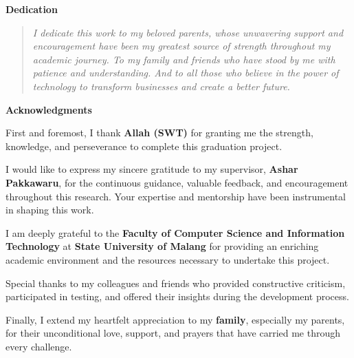 \documentclass[12pt,a4paper]{report}
\begin{document}
\newpage
\thispagestyle{empty}
\vspace*{3cm}
\begin{center}
{\LARGE\textbf{Dedication}}\\[1.5cm]
\end{center}

\begin{quote}
\large
\textit{I dedicate this work to my beloved parents, whose unwavering support and encouragement have been my greatest source of strength throughout my academic journey. To my family and friends who have stood by me with patience and understanding. And to all those who believe in the power of technology to transform businesses and create a better future.}
\end{quote}
\newpage

\newpage
\thispagestyle{empty}
\vspace*{2cm}
\begin{center}
{\LARGE\textbf{Acknowledgments}}\\[1.5cm]
\end{center}

First and foremost, I thank \textbf{Allah (SWT)} for granting me the strength, knowledge, and perseverance to complete this graduation project.

I would like to express my sincere gratitude to my supervisor, \textbf{Ashar Pakkawaru}, for the continuous guidance, valuable feedback, and encouragement throughout this research. Your expertise and mentorship have been instrumental in shaping this work.

I am deeply grateful to the \textbf{Faculty of Computer Science and Information Technology} at \textbf{State University of Malang} for providing an enriching academic environment and the resources necessary to undertake this project.

Special thanks to my colleagues and friends who provided constructive criticism, participated in testing, and offered their insights during the development process.

Finally, I extend my heartfelt appreciation to my \textbf{family}, especially my parents, for their unconditional love, support, and prayers that have carried me through every challenge.
\end{document}
